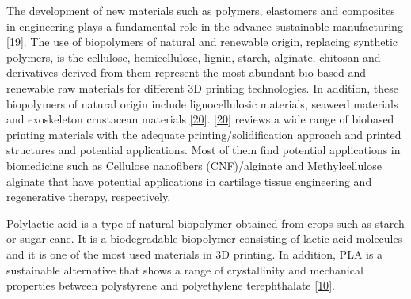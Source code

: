 \documentclass[conference,final,]{IEEEtran}
\begin{document}
The development of new materials such as polymers, elastomers and
composites in engineering plays a fundamental role in the advance
sustainable manufacturing \protect\hyperlink{ref-Ashby2013}{{[}19{]}}.
The use of biopolymers of natural and renewable origin, replacing
synthetic polymers, is the cellulose, hemicellulose, lignin, starch,
alginate, chitosan and derivatives derived from them represent the most
abundant bio-based and renewable raw materials for different 3D printing
technologies. In addition, these biopolymers of natural origin include
lignocellulosic materials, seaweed materials and exoskeleton crustacean
materials \protect\hyperlink{ref-Liu2019a}{{[}20{]}}.
\protect\hyperlink{ref-Liu2019a}{{[}20{]}} reviews a wide range of
biobased printing materials with the adequate printing/solidification
approach and printed structures and potential applications. Most of them
find potential applications in biomedicine such as Cellulose nanofibers
(CNF)/alginate and Methylcellulose alginate that have potential
applications in cartilage tissue engineering and regenerative therapy,
respectively.

Polylactic acid is a type of natural biopolymer obtained from crops such
as starch or sugar cane. It is a biodegradable biopolymer consisting of
lactic acid molecules and it is one of the most used materials in 3D
printing. In addition, PLA is a sustainable alternative that shows a
range of crystallinity and mechanical properties between polystyrene and
polyethylene terephthalate \protect\hyperlink{ref-Zhao2018a}{{[}10{]}}.
\end{document}
